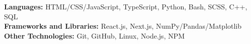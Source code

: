 

\begin{cvparagraph}

\textbf{Languages:} HTML/CSS/JavaScript, TypeScript, Python, Bash, SCSS, C++, SQL \\
\textbf{Frameworks and Libraries:} React.js, Next.js, NumPy/Pandas/Matplotlib \\
\textbf{Other Technologies:} Git, GitHub, Linux, Node.js, NPM 
    
\end{cvparagraph}
